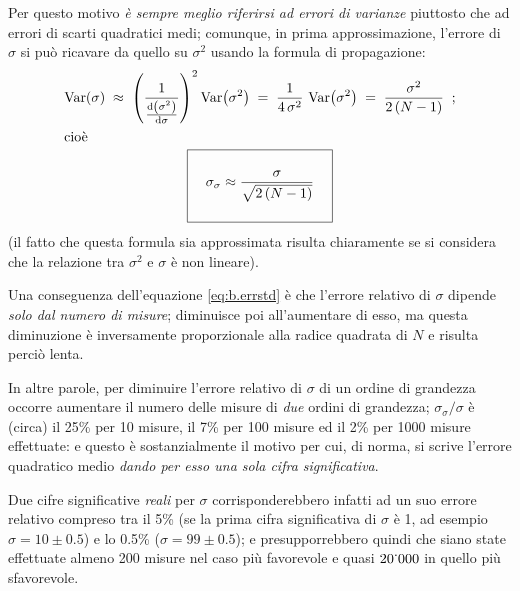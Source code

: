 Per questo motivo \emph{\`e sempre meglio riferirsi ad
  errori di varianze} piuttosto che ad errori di scarti
quadratici medi; comunque, in prima approssimazione,
l'errore di $\sigma$ si pu\`o ricavare da quello su
$\sigma^2$ usando la formula di propagazione:
\begin{gather}
  \var ( \sigma ) \; \approx \; \left(
    \frac{1}{\tfrac{\de \left( \sigma^2 \right)}
    {\de \sigma}} \right)^2 \var \bigl( \sigma^2
    \bigr) \; = \; \frac{1}{4 \, \sigma^2} \, \var
    \bigl( \sigma^2 \bigr) \; = \; \frac{\sigma^2}
   {2 \, (N - 1)} \peq ; \notag \\
  \intertext{cio\`e}%
  \index{errore!dell'errore stimato}
  \boxed{ \rule[-8mm]{0mm}{16mm} \quad
    \sigma_\sigma \approx
    \dfrac{\sigma}{\sqrt{2 \, (N - 1)}} \quad}
    \label{eq:b.errstd}
\end{gather}
(il fatto che questa formula sia approssimata risulta
chiaramente se si considera che la relazione tra $\sigma^2$
e $\sigma$ \`e non lineare).

Una conseguenza dell'equazione \eqref{eq:b.errstd} \`e che
l'errore relativo di $\sigma$ dipende \emph{solo dal numero
  di misure}; diminuisce poi all'aumentare di esso, ma
questa diminuzione \`e inversamente proporzionale alla
radice quadrata di $N$ e risulta perci\`o lenta.

%
In altre parole, per diminuire l'errore relativo di $\sigma$
di un ordine di grandezza occorre aumentare il numero delle
misure di \emph{due} ordini di grandezza; $\sigma_\sigma /
\sigma$ \`e (circa) il 25\% per 10 misure, il 7\% per 100
misure ed il 2\% per 1000 misure effettuate: e questo \`e
sostanzialmente il motivo per cui, di norma, si scrive
l'errore quadratico medio \emph{dando per esso una sola
  cifra significativa}.

Due cifre significative \emph{reali} per $\sigma$
corrisponderebbero infatti ad un suo errore relativo
compreso tra il 5\% (se la prima cifra significativa di
$\sigma$ \`e 1, ad esempio $\sigma = 10 \pm 0.5$) e lo 0.5\%
($\sigma = 99 \pm 0.5$); e presupporrebbero quindi che
siano state effettuate almeno 200 misure nel caso pi\`u
favorevole e quasi $20\updot 000$ in quello pi\`u
sfavorevole.%

\endinput
